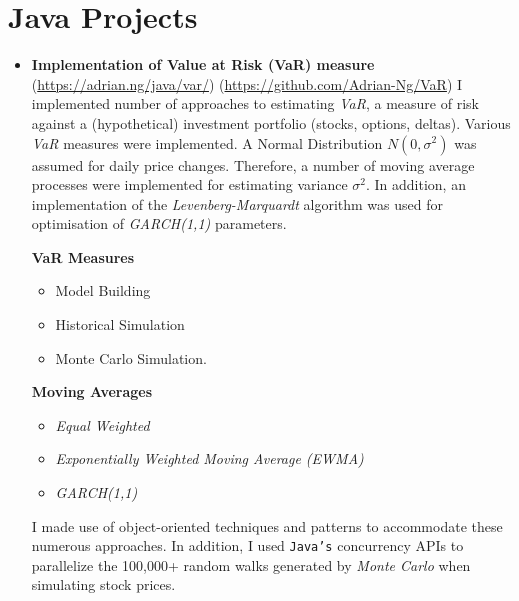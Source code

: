 \documentclass[letterpaper,11pt]{article}
\begin{document}
\section{Java Projects}
\begin{itemize}
	\item {
	      \textbf{Implementation of Value at Risk (VaR) measure}
	      \hfill
	      \tiny
	      (\href{https://adrian.ng/java/var/}{https://adrian.ng/java/var/})
	      \hfill
	      (\href{https://github.com/Adrian-Ng/VaR}{https://github.com/Adrian-Ng/VaR})
	      \newline
	      \small
	      I implemented number of approaches to estimating \textit{VaR}, a measure of risk against a (hypothetical) investment portfolio (stocks, options, deltas). Various \textit{VaR} measures were implemented. A Normal Distribution $N(0, \sigma^2)$ was assumed for daily price changes. Therefore, a number of moving average processes were implemented for estimating variance $\sigma^2$.
	      In addition, an implementation of the \textit{Levenberg-Marquardt} algorithm was used for optimisation of \textit{GARCH(1,1)} parameters.
	      \begin{multicols}{2}
		      \textbf{VaR Measures}
		      \begin{itemize}
			      \item Model Building
			      \item Historical Simulation
			      \item Monte Carlo Simulation.
		      \end{itemize}
		      \columnbreak
		      \textbf{Moving Averages}
		      \begin{itemize}
			      \item \textit{Equal Weighted}
			      \item \textit{Exponentially Weighted Moving Average (EWMA)}
			      \item \textit{GARCH(1,1)}
		      \end{itemize}
	      \end{multicols}
	      I made use of object-oriented techniques and patterns to accommodate these numerous approaches.
	      In addition, I used \texttt{Java's} concurrency APIs to parallelize the 100,000+ random walks generated by \textit{Monte Carlo} when simulating stock prices.
}
\end{itemize}
\end{document}
